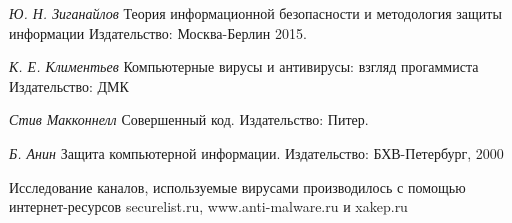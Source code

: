 \begin{thebibliography}{00}

\textit{Ю. Н. Зиганайлов} Теория информационной безопасности и методология защиты информации Издательство: Москва-Берлин 2015.

\textit{К. Е. Климентьев} Компьютерные вирусы и антивирусы: взгляд прогаммиста Издательство: ДМК

\textit{Стив Макконнелл} Совершенный код. Издательство: Питер.


\textit{Б. Анин} Защита компьютерной информации. Издательство: БХВ-Петербург, 2000

Исследование каналов, используемые вирусами производилось с помощью интернет-ресурсов securelist.ru, www.anti-malware.ru и xakep.ru

\end{thebibliography}